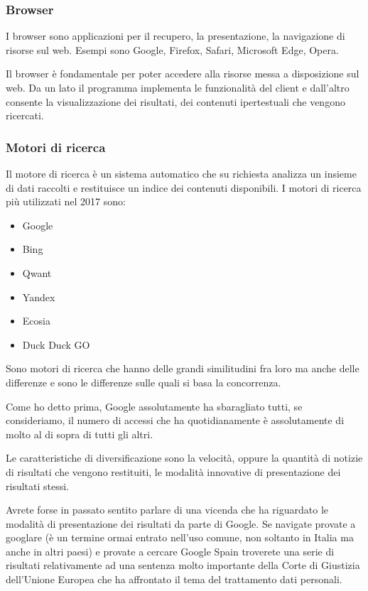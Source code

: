 \subsubsection{Browser}
I browser sono applicazioni per il recupero, la presentazione, la navigazione di risorse sul web. 
Esempi sono  Google, Firefox, Safari, Microsoft Edge, Opera.

Il browser è fondamentale per poter accedere alla risorse messa a disposizione sul web. Da un lato il programma implementa le funzionalità del client e dall'altro consente la visualizzazione dei risultati, dei contenuti ipertestuali che vengono ricercati.

\subsubsection{Motori di ricerca}
Il motore di ricerca è un sistema automatico che su richiesta analizza un insieme di dati raccolti e restituisce un indice dei contenuti disponibili. I motori di ricerca più utilizzati nel 2017 sono:

\begin{itemize}
    \item Google
    \item Bing
    \item Qwant
    \item Yandex
    \item Ecosia
    \item Duck Duck GO
\end{itemize}

Sono motori di ricerca che hanno delle grandi similitudini fra loro ma anche delle differenze e sono le differenze sulle quali si basa la concorrenza. 

Come ho detto prima, Google assolutamente ha sbaragliato tutti, se consideriamo, il numero di accessi che ha quotidianamente è assolutamente di molto al di sopra di tutti gli altri.

Le caratteristiche di diversificazione sono la velocità, oppure la quantità di notizie di risultati che vengono restituiti, le modalità innovative di presentazione dei risultati stessi.

Avrete forse in passato sentito parlare di una vicenda che ha riguardato le modalità di presentazione dei risultati da parte di Google. Se navigate provate a googlare (è un termine ormai entrato nell'uso comune, non soltanto in Italia ma anche in altri paesi) e provate a cercare Google Spain troverete una serie di risultati relativamente ad una sentenza molto importante della Corte di Giustizia dell'Unione Europea che ha affrontato il tema del trattamento dati personali.

